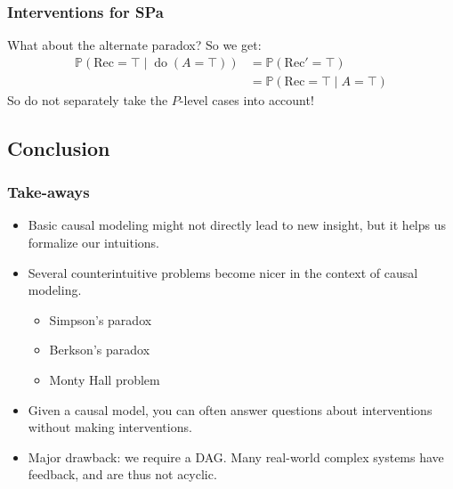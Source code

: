 \documentclass{beamer}
\renewcommand{\P}{\mathbb{P}}
\DeclareMathOperator{\Do}{do}
\newcommand{\Rec}{\text{Rec}}
\begin{document}
\begin{frame}
    \frametitle{Interventions for SPa}
    What about the alternate paradox?
    \pause\pause
    So we get:
    \begin{align*}
        \P(\Rec = \top \mid \Do(A = \top)) &= \P(\Rec' = \top)\\
        &= \P(\Rec = \top \mid A = \top)
    \end{align*}
    So do not separately take the $P$-level cases into account!
\end{frame}

\subsection{Conclusion}
\begin{frame}
    \frametitle{Take-aways}
    \begin{itemize}
        \item Basic causal modeling might not directly lead to new insight, but
            it helps us formalize our intuitions.
        \item Several counterintuitive problems become nicer in the context of
            causal modeling. 
            \begin{itemize}
                \item Simpson's paradox
                \item Berkson's paradox
                \item Monty Hall problem
            \end{itemize}
        \item Given a causal model, you can often answer questions about
            interventions without making interventions.
        \item Major drawback: we require a DAG. Many real-world complex systems
            have feedback, and are thus not acyclic.
    \end{itemize}
\end{frame}
\end{document}
